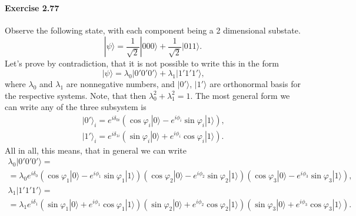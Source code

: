\documentclass[a4paper,12pt]{article}
\newcommand{\exercise}[1]{\paragraph{Exercise #1}}
\newcommand{\ra}{\rangle}
\begin{document}
    \exercise{2.77} Observe the following state, with each component being a 2 dimensional substate.
    \begin{equation}
        | \psi \ra = \frac{1}{\sqrt{2}} | 000 \ra + \frac{1}{\sqrt{2}} | 011 \ra \textrm{.}
    \end{equation}
    Let's prove by contradiction, that it is not possible to write this in the form
    \begin{equation}
        | \psi \ra = \lambda_0 |0' 0' 0' \ra + \lambda_1 |1' 1' 1' \ra \textrm{,}
    \end{equation}
    where $\lambda_0$ and $\lambda_1$ are nonnegative numbers, and $|0' \ra$, $| 1' \ra$ are orthonormal basis for the respective systems. Note, that then $\lambda_0^2 + \lambda_1^2 = 1$. The most general form we can write any of the three subsystem is
    \begin{gather}
        \nonumber
        |0' \ra_i = e^{i\delta_{0i}} (\cos \varphi_i |0\ra - e^{i\phi_i} \sin \varphi_i |1 \ra) \textrm{,}\\
        |1' \ra_i = e^{i\delta_{1i}} (\sin \varphi_i |0\ra + e^{i\phi_i} \cos \varphi_i |1 \ra) \textrm{.}
    \end{gather}
    All in all, this means, that in general we can write
    \begin{gather}
        \nonumber
        \lambda_0 | 0' 0' 0' \ra =\\
        \nonumber
        = \lambda_0 e^{i\delta_0}
        (\cos \varphi_1 |0\ra - e^{i\phi_1} \sin \varphi_1 |1 \ra)
        (\cos \varphi_2 |0\ra - e^{i\phi_2} \sin \varphi_2 |1 \ra)
        (\cos \varphi_3 |0\ra - e^{i\phi_3} \sin \varphi_3 |1 \ra) \textrm{,}\\
        \nonumber
        \lambda_1 | 1' 1' 1' \ra =\\
        = \lambda_1 e^{i\delta_1}
        (\sin \varphi_1 |0\ra + e^{i\phi_1} \cos \varphi_1 |1 \ra)
        (\sin \varphi_2 |0\ra + e^{i\phi_2} \cos \varphi_2 |1 \ra)
        (\sin \varphi_3 |0\ra + e^{i\phi_3} \cos \varphi_3 |1 \ra) \textrm{.}
    \end{gather}
\end{document}
